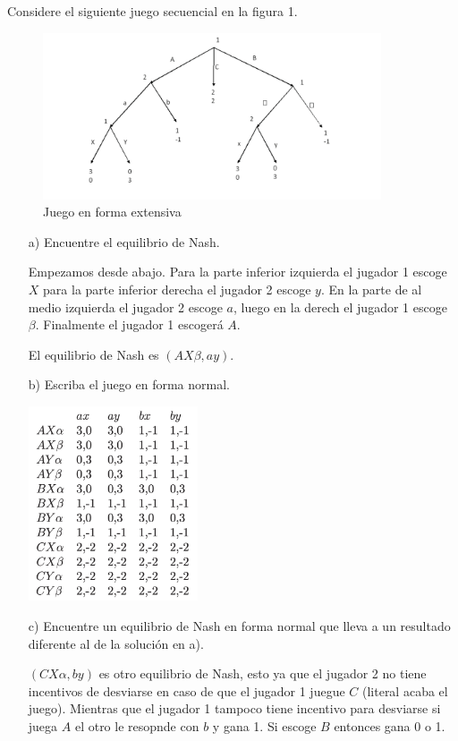 \documentclass{exam}
\begin{document}
Considere el siguiente juego secuencial en la figura 1.
\begin{figure}[h]
    \centering
    \caption{Juego en forma extensiva}
    \includegraphics[width=10cm]{Captura de pantalla 2024-08-19 a la(s) 1.12.33 p. m..png}
\end{figure}
\begin{itemize}
    \item[a)] Encuentre el equilibrio de Nash.
    \begin{solution}
        Empezamos desde abajo. Para la parte inferior izquierda el jugador 1 escoge \( X \) para la parte inferior derecha el jugador 2 escoge \( y \). En la parte de al medio izquierda el jugador 2 escoge $a$, luego en la derech  el jugador 1 escoge $\beta$. Finalmente el jugador 1 escogerá $A$. 

        El equilibrio de Nash es \( (AX\beta, ay) \).
    \end{solution} 
    \item[b)] Escriba el juego en forma normal. 
    \begin{solution}
        \begin{center}
            \centering
            \includegraphics[width=5cm]{Captura de pantalla 2024-08-19 a la(s) 1.22.53 p. m..png}
        \end{center}
    \end{solution}
    \item[c)] Encuentre un equilibrio de Nash en forma normal que lleva a un resultado diferente al de la solución en a).
    \begin{solution}
        \( (CX\alpha, by) \) es otro equilibrio de Nash, esto ya que el jugador 2 no tiene incentivos de desviarse en caso de que el jugador 1 juegue \( C \) (literal acaba el juego). Mientras que el jugador 1 tampoco tiene incentivo para desviarse si juega $A$ el otro le resopnde con $b$ y gana 1. Si escoge $B$ entonces gana 0 o 1.
        

\end{solution}
\end{itemize}
\end{document}
